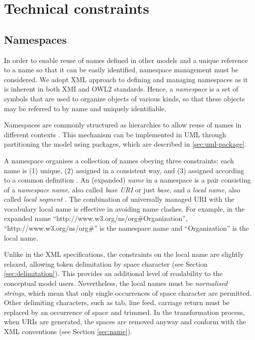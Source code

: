 \section{Technical constraints}
\label{sec:technical}
		
	\subsection{Namespaces}
	\label{sec:namespaces}
	
	In order to enable reuse of names defined in other models and a unique reference to a name so that it can be easily identified, namespace management must be considered. We adopt XML approach to defining and managing namespaces as it is inherent in both XMI and OWL2 standards. Hence, a \textit{namespace} is a set of symbols that are used to organize objects of various kinds, so that these objects may be referred to by name and uniquely identifiable. 
	
	Namespaces are commonly structured as hierarchies to allow reuse of names in different contexts \cite{xml-namespaces}. This mechanism can be implemented in UML through partitioning the model using packages, which are described in \ref{sec:uml-package}.
	
	A namespace organises a collection of names obeying three constraints:
	each name is (1) unique, (2) assigned in a consistent way, and (3)
	assigned according to a common definition \cite{urn-rfc8141}. An (expanded) \textit{name} in a namespace is a pair consisting of a \textit{namespace name}, also called \textit{base URI} or just \textit{base}, and a \textit{local name}, also called \textit{local segment} \cite{xml1-spec,urn-rfc2141}. The combination of universally managed URI with the vocabulary local name is effective in avoiding name clashes. 	
	For example, in the expanded name ``http://www.w3.org/ns/org\#Organization'', ``http://www.w3.org/ns/org\#'' is the namespace name and ``Organization'' is the local name. 

	Unlike in the XML specifications, the constraints on the local name are slightly relaxed, allowing token delimitation by space character (see Section \ref{sec:delimitation}). This provides an additional level of readability to the conceptual model users. Nevertheless, the local names must be \textit{normalised strings}, which mean that only single occurrences of space character are permitted. Other delimiting characters, such as tab, line feed, carriage return must be replaced by an occurrence of space and trimmed. 
	In the transformation process, when URIs are generated, the spaces are removed anyway and conform with the XML conventions (see Section \ref{sec:name}).

